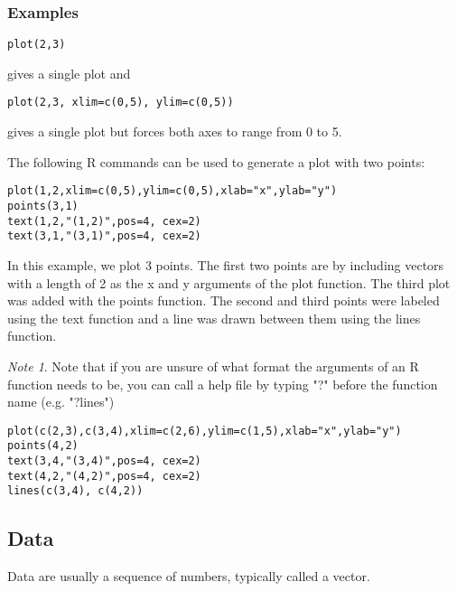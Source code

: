 \documentclass[12pt,a4paper]{article}
\theoremstyle{regla}
\theoremstyle{remark}
\newtheorem{notes}{Note}[section]
\theoremstyle{definition}
\theoremstyle{nonumberbreak}
\begin{document}
\subsubsection{Examples}
\begin{xmpl}

\begin{lstlisting}
plot(2,3)
\end{lstlisting}

gives a single plot and

\begin{lstlisting}
plot(2,3, xlim=c(0,5), ylim=c(0,5))
\end{lstlisting}

gives a single plot but forces both axes to range from 0 to 5.
\end{xmpl}
\begin{xmpl}
The following R commands can be used to generate a plot with two points:

\begin{lstlisting}
plot(1,2,xlim=c(0,5),ylim=c(0,5),xlab="x",ylab="y")
points(3,1)
text(1,2,"(1,2)",pos=4, cex=2)
text(3,1,"(3,1)",pos=4, cex=2)
\end{lstlisting}
\end{xmpl}
\begin{xmpl}


In this example, we plot 3 points. The first two
points are by including vectors with a length of 2 as the x and y
arguments of the plot function. The third plot was added with the
points function. The second and third points were labeled using the
text function and a line was drawn between them using the lines
function.
\begin{notes}
Note that if you are unsure of what format the arguments of
an R function needs to be, you can call a help file by typing "?"
before the function name (e.g. "?lines")
\end{notes}

\begin{lstlisting}
plot(c(2,3),c(3,4),xlim=c(2,6),ylim=c(1,5),xlab="x",ylab="y")
points(4,2)
text(3,4,"(3,4)",pos=4, cex=2)
text(4,2,"(4,2)",pos=4, cex=2)
lines(c(3,4), c(4,2))
\end{lstlisting}
\end{xmpl}


\subsection{Data}
\begin{fbox}
\begin{minipage}{0.97\textwidth}
Data are usually a sequence of numbers, typically called a vector.



\end{minipage}
\end{fbox}
\end{document}
